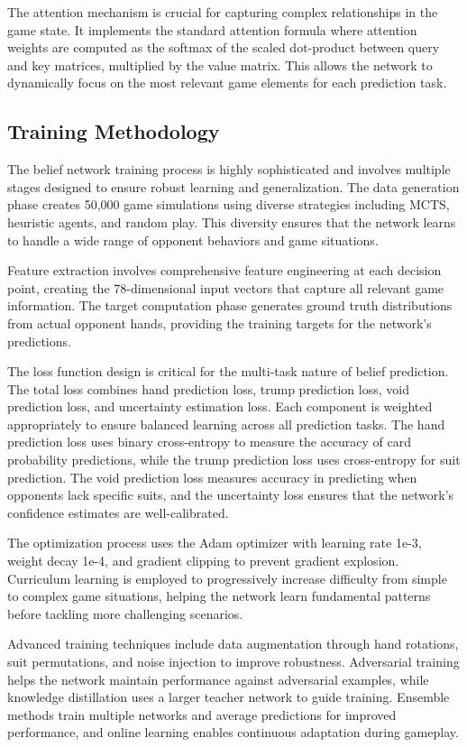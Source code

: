 \documentclass[conference]{IEEEtran}
\begin{document}
The attention mechanism is crucial for capturing complex relationships in the game state. It implements the standard attention formula where attention weights are computed as the softmax of the scaled dot-product between query and key matrices, multiplied by the value matrix. This allows the network to dynamically focus on the most relevant game elements for each prediction task.

\subsection{Training Methodology}

The belief network training process is highly sophisticated and involves multiple stages designed to ensure robust learning and generalization. The data generation phase creates 50,000 game simulations using diverse strategies including MCTS, heuristic agents, and random play. This diversity ensures that the network learns to handle a wide range of opponent behaviors and game situations.

Feature extraction involves comprehensive feature engineering at each decision point, creating the 78-dimensional input vectors that capture all relevant game information. The target computation phase generates ground truth distributions from actual opponent hands, providing the training targets for the network's predictions.

The loss function design is critical for the multi-task nature of belief prediction. The total loss combines hand prediction loss, trump prediction loss, void prediction loss, and uncertainty estimation loss. Each component is weighted appropriately to ensure balanced learning across all prediction tasks. The hand prediction loss uses binary cross-entropy to measure the accuracy of card probability predictions, while the trump prediction loss uses cross-entropy for suit prediction. The void prediction loss measures accuracy in predicting when opponents lack specific suits, and the uncertainty loss ensures that the network's confidence estimates are well-calibrated.

The optimization process uses the Adam optimizer with learning rate 1e-3, weight decay 1e-4, and gradient clipping to prevent gradient explosion. Curriculum learning is employed to progressively increase difficulty from simple to complex game situations, helping the network learn fundamental patterns before tackling more challenging scenarios.

Advanced training techniques include data augmentation through hand rotations, suit permutations, and noise injection to improve robustness. Adversarial training helps the network maintain performance against adversarial examples, while knowledge distillation uses a larger teacher network to guide training. Ensemble methods train multiple networks and average predictions for improved performance, and online learning enables continuous adaptation during gameplay.
\end{document}
